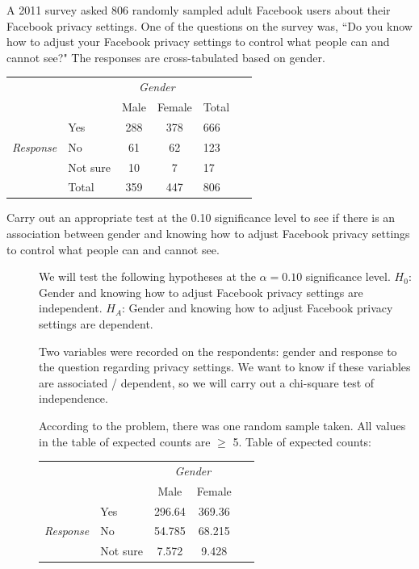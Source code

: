 \begin{examplewrap}
\begin{nexample}{A 2011 survey asked 806 randomly sampled adult Facebook users about their Facebook privacy settings. One of the questions on the survey was, ``Do you know how to adjust your Facebook privacy settings to control what people can and cannot see?" The responses are cross-tabulated based on gender. 
\label{facebookprivacy}
\begin{center}
\begin{tabular}{l l c c ll}
								&			& \multicolumn{2}{c}{\textit{Gender}}	& &\hspace{10mm}\ 		\\
\cline{3-4}
								&			& Male		& Female		& Total	\\
\cline{2-5}
								& Yes		& 288		& 378		& 666	\\
\textit{Response}					& No			& 61			& 62 			& 123	\\
								& Not sure	& 10			& 7 			& 17	\\
\cline{2-5}
								& Total		& 359		& 447		& 806
\end{tabular}
\end{center}
Carry out an appropriate test at the 0.10 significance level to see if there is an association between gender and knowing how to adjust Facebook privacy settings to control what people can and cannot see.}
\begin{description}
\item[] We will test the following hypotheses at the $\alpha=0.10$ significance level.  
\newline $H_0$: Gender and knowing how to adjust Facebook privacy settings are \mbox{independent.}
\newline $H_A$: Gender and knowing how to adjust Facebook privacy settings are \mbox{dependent.}
\item[] Two variables were recorded on the respondents: gender and response to the question regarding privacy settings.  We want to know if these variables are associated / dependent, so we will carry out a chi-square test of independence.  
\item[] According to the problem, there was one random sample taken.  All values in the table of expected counts are $\ge$ 5.
Table of expected counts:
\begin{center}
\begin{tabular}{l l c c l}
								&			& \multicolumn{2}{c}{\textit{Gender}}	&\hspace{17mm}\ 		\\
\cline{3-4}
								&			& Male		& Female	\\
\cline{2-4}
								& Yes		& 296.64		& 369.36	\\
\textit{Response}					& No			& 54.785		& 68.215	\\
								& Not sure	& 7.572		& 9.428	\\
\cline{2-4}
\end{tabular}
\end{center}


\end{description}
\end{nexample}
\end{examplewrap}
